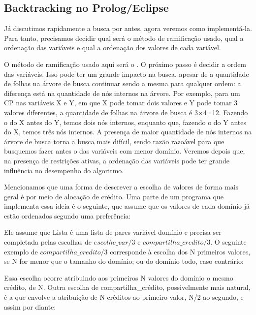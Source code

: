 \documentclass{article}
\begin{document}
\subsection{Backtracking no Prolog/Eclipse}

Já discutimos rapidamente a busca por  antes, agora veremos como implementá-la. Para tanto, precisamos decidir qual será o método de ramificação usado, qual a ordenação das variáveis e qual a ordenação dos valores de cada variável.

O método de ramificação usado aqui será o . O próximo passo é decidir a ordem das variáveis. Isso pode ter um grande impacto na busca, apesar de a quantidade de folhas na árvore de busca continuar sendo a mesma para qualquer ordem: a diferença está na quantidade de nós internos na árvore. Por exemplo, para um CP nas variáveis X e Y, em que X pode tomar dois valores e Y pode tomar 3 valores diferentes, a quantidade de folhas na árvore de busca é 3$\times$4=12. Fazendo o
do X antes do Y, temos dois nós internos, enquanto que, fazendo o  do Y antes do X, temos três nós internos. A presença de maior quantidade de nós internos na árvore de busca torna a busca mais difícil, sendo razão razoável para que busquemos fazer antes o  das variáveis com menor domínio. Veremos depois que, na presença de restrições ativas, a ordenação das variáveis pode ter grande influência no desempenho do algoritmo.

Mencionamos que uma forma de descrever a escolha de valores de forma mais geral é por meio de alocação de crédito. Uma parte de um programa que implementa essa ideia é o seguinte, que assume que os valores de cada domínio já estão ordenados segundo uma preferência:



Ele assume que Lista é uma lista de pares variável-domínio e precisa ser completada pelas escolhas de $escolhe\_var/3$ e $compartilha\_credito/3$. O seguinte exemplo de $compartilha\_credito/3$ corresponde à escolha dos N primeiros valores, se N for menor
que o tamanho do domínio; ou do domínio todo,
caso contrário:



Essa escolha ocorre atribuindo aos primeiros N valores do domínio o mesmo crédito, de N. Outra escolha de compartilha\_crédito, possivelmente mais natural, é a que envolve a atribuição de N créditos ao primeiro valor, N/2 ao segundo, e assim por diante:
\end{document}
